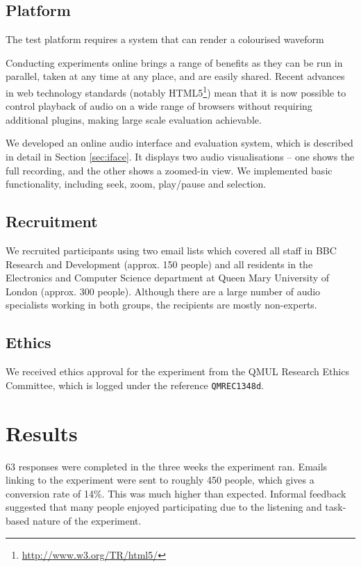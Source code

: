 \subsection{Platform}
The test platform requires a system that can render a colourised waveform

Conducting experiments online brings a range of benefits as they can be run in parallel, taken at any time at any
place, and are easily shared. Recent advances in web technology standards (notably
HTML5\footnote{\url{http://www.w3.org/TR/html5/}}) mean that it is now possible to control playback of audio on a wide
range of browsers without requiring additional plugins, making large scale evaluation achievable.

We developed an online audio interface and evaluation system, which is described in detail in Section \ref{sec:iface}.
It displays two audio visualisations -- one shows the full recording, and the other shows a zoomed-in view. We
implemented basic functionality, including seek, zoom, play/pause and selection.

\subsection{Recruitment}\label{sec:colourised-recruitment}
We recruited participants using two email lists which covered all staff in BBC Research and Development (approx. 150
people) and all residents in the Electronics and Computer Science department at Queen Mary University of London
(approx. 300 people). Although there are a large number of audio specialists working in both groups, the recipients are
mostly non-experts.

\subsection{Ethics}
We received ethics approval for the experiment from the QMUL Research Ethics Committee, which is logged under the reference
\texttt{QMREC1348d}. 

\section{Results}
63 responses were completed in the three weeks the experiment ran. Emails linking to the experiment were sent to
roughly 450 people, which gives a conversion rate of 14\%. This was much higher than expected. Informal feedback
suggested that many people enjoyed participating due to the listening and task-based nature of the experiment. 

